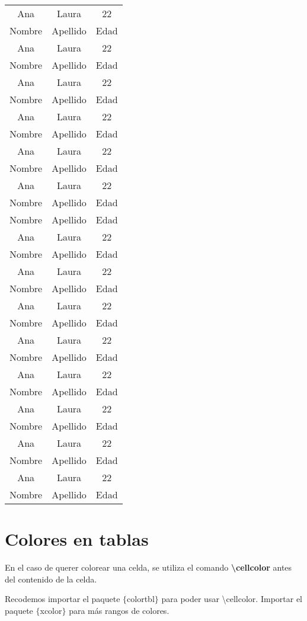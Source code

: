 \documentclass{article}
\begin{document}
\begin{longtable}{c c c}
	Ana & Laura & 22 \\	
	Nombre & Apellido & Edad \\
	Ana & Laura & 22 \\
	Nombre & Apellido & Edad \\
	Ana & Laura & 22 \\
	Nombre & Apellido & Edad \\
	Ana & Laura & 22 \\
	Nombre & Apellido & Edad \\
	Ana & Laura & 22 \\
	Nombre & Apellido & Edad \\
	Ana & Laura & 22 \\
	Nombre & Apellido & Edad \\
	Nombre & Apellido & Edad \\
	Ana & Laura & 22 \\
	Nombre & Apellido & Edad \\
	Ana & Laura & 22 \\
	Nombre & Apellido & Edad \\
	Ana & Laura & 22 \\	
	Nombre & Apellido & Edad \\
	Ana & Laura & 22 \\
	Nombre & Apellido & Edad \\
	Ana & Laura & 22 \\
	Nombre & Apellido & Edad \\
	Ana & Laura & 22 \\
	Nombre & Apellido & Edad \\
	Ana & Laura & 22 \\
	Nombre & Apellido & Edad \\
	Ana & Laura & 22 \\
	Nombre & Apellido & Edad \\
\end{longtable}


\newpage
\section{Colores en tablas}
En el caso de querer colorear una celda, se utiliza el comando \textbf{\textbackslash cellcolor} antes del contenido de la celda.

Recodemos importar el paquete $\lbrace$colortbl$\rbrace$ para poder usar \textbackslash cellcolor. Importar el paquete $\lbrace$xcolor$\rbrace$ para más rangos de colores.
\end{document}
